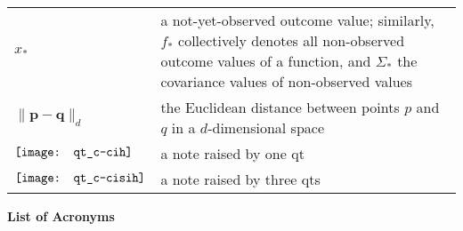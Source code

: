\begin{tabularx}{\linewidth}{l@{\quad}X}
	$x_*$	&	a not-yet-observed outcome value; similarly, $f_*$ collectively denotes all non-observed outcome values of a function, and $\Sigma_*$ the covariance values of non-observed values \\
	$\lVert \mathbf{p - q} \rVert_d$ & the Euclidean distance between points $p$ and $q$ in a $d$-dimensional space\\
	$\vcenter{\hbox{\texttt{[image: qt\_c-cih]}}}$	& a note raised by one \acl{qt}\\
	$\vcenter{\hbox{\texttt{[image: qt\_c-cisih]}}}$	& a note raised by three \aclp{qt}\\
\end{tabularx}

\newpage
\acbarrier %
\vspace*{-2cm}
{\Huge \textbf{List of Acronyms}}\\[.3cm]
\begin{multicols}{2}
	\printacronyms
\end{multicols}

\clearpage %
\pagestyle{fancy} %
\renewcommand{\headrulewidth}{0.4pt} %
\renewcommand{\chaptermark}[1]{\markboth{Chapter~\thechapter~--~#1}{}} %
\renewcommand{\sectionmark}[1]{\markright{\thesection\quad#1}} %
\fancyhead[LO]{\leftmark} %
\fancyhead[RE]{\rightmark} %

\addtocounter{page}{1} %
